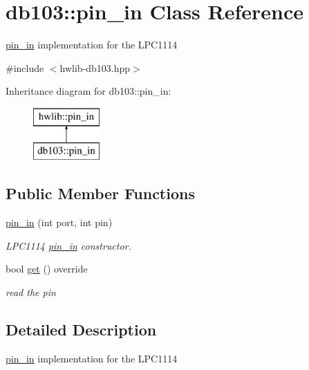 \hypertarget{classdb103_1_1pin__in}{}\section{db103\+:\+:pin\+\_\+in Class Reference}
\label{classdb103_1_1pin__in}


\hyperlink{classdb103_1_1pin__in}{pin\+\_\+in} implementation for the L\+P\+C1114  




{\ttfamily \#include $<$hwlib-\/db103.\+hpp$>$}

Inheritance diagram for db103\+:\+:pin\+\_\+in\+:\begin{figure}[H]
\begin{center}
\leavevmode
\includegraphics[height=2.000000cm]{classdb103_1_1pin__in}
\end{center}
\end{figure}
\subsection*{Public Member Functions}
\begin{DoxyCompactItemize}
\item 
\hyperlink{classdb103_1_1pin__in_a26dc0725877d633361e583d12a71076c}{pin\+\_\+in} (int port, int pin)
\begin{DoxyCompactList}\small\item\em L\+P\+C1114 \hyperlink{classdb103_1_1pin__in}{pin\+\_\+in} constructor. \end{DoxyCompactList}\item 
bool \hyperlink{classdb103_1_1pin__in_a553663fb9fbb81aad104c0d52cff4839}{get} () override
\begin{DoxyCompactList}\small\item\em read the pin \end{DoxyCompactList}\end{DoxyCompactItemize}


\subsection{Detailed Description}
\hyperlink{classdb103_1_1pin__in}{pin\+\_\+in} implementation for the L\+P\+C1114 

